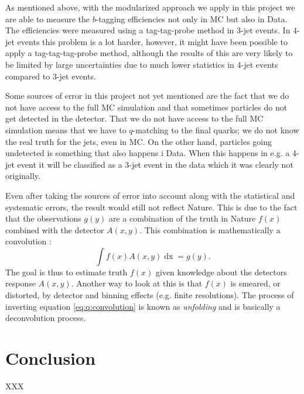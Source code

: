 As mentioned above, with the modularized approach we apply in this project we are able to measure the $b$-tagging efficiencies not only in MC but also in Data. The efficiencies were measured using a tag-tag-probe method in 3-jet events. In 4-jet events this problem is a lot harder, however, it might have been possible to apply a tag-tag-tag-probe method, although the results of this are very likely to be limited by large uncertainties due to much lower statistics in 4-jet events compared to 3-jet events. 

Some sources of error in this project not yet mentioned are the fact that we do not have access to the full MC simulation and that sometimes particles do not get detected in the detector. That we do not have access to the full MC simulation means that we have to $q$-matching to the final quarks; we do not know the real truth for the jets, even in MC. On the other hand, particles going undetected is something that also happens i Data. When this happens in e.g. a 4-jet event it will be classified as a 3-jet event in the data which it was clearly not originally. 

Even after taking the sources of error into account along with the statistical and systematic errors, the result would still not reflect Nature. This is due to the fact that the observations $g(y)$ are a combination of the truth in Nature $f(x)$ combined with the detector $A(x, y)$. This combination is mathematically a convolution \autocite{schmittDataUnfoldingMethods2017}: 
\begin{equation}
  \label{eq:q:convolution}
  \int f(x) A(x, y) \mathop{dx} = g(y).
\end{equation}
The goal is thus to estimate truth $f(x)$ given knowledge about the detectors response $A(x,y)$. Another way to look at this is that $f(x)$ is smeared, or distorted, by detector and binning effects (e.g. finite resolutions). The process of inverting equation \eqref{eq:q:convolution} is known as \emph{unfolding} and is basically a deconvolution process. 

\section{Conclusion}
\label{sec:q:conclusion}

XXX \TODO